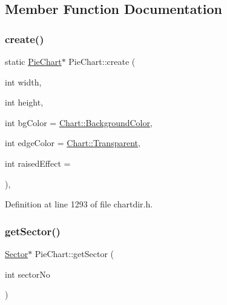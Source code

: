 \subsection{Member Function Documentation}
\mbox{\label{class_pie_chart_abede1a66c46dfa9d3a8c0490e8190a4c}} 
\subsubsection{\texorpdfstring{create()}{create()}}
{\footnotesize\ttfamily static \hyperlink{class_pie_chart}{Pie\+Chart}$\ast$ Pie\+Chart\+::create (\begin{DoxyParamCaption}\item[{int}]{width,  }\item[{int}]{height,  }\item[{int}]{bg\+Color = {\ttfamily \hyperlink{namespace_chart_abee0d882fdc9ad0b001245ad9fc64011a134193bde693b9d152d0c6dc59fa7d7f}{Chart\+::\+Background\+Color}},  }\item[{int}]{edge\+Color = {\ttfamily \hyperlink{namespace_chart_abee0d882fdc9ad0b001245ad9fc64011afc6811800a9e2582dac0157b6279f836}{Chart\+::\+Transparent}},  }\item[{int}]{raised\+Effect = {} }\end{DoxyParamCaption})\hspace{0.3cm}{\ttfamily [inline]}, {\ttfamily [static]}}



Definition at line 1293 of file chartdir.\+h.

\mbox{\label{class_pie_chart_a2fabcab450f4eddf29566a2fbbe3c67d}} 
\subsubsection{\texorpdfstring{get\+Sector()}{getSector()}}
{\footnotesize\ttfamily \hyperlink{class_sector}{Sector}$\ast$ Pie\+Chart\+::get\+Sector (\begin{DoxyParamCaption}\item[{int}]{sector\+No }\end{DoxyParamCaption})\hspace{0.3cm}{\ttfamily [inline]}}



